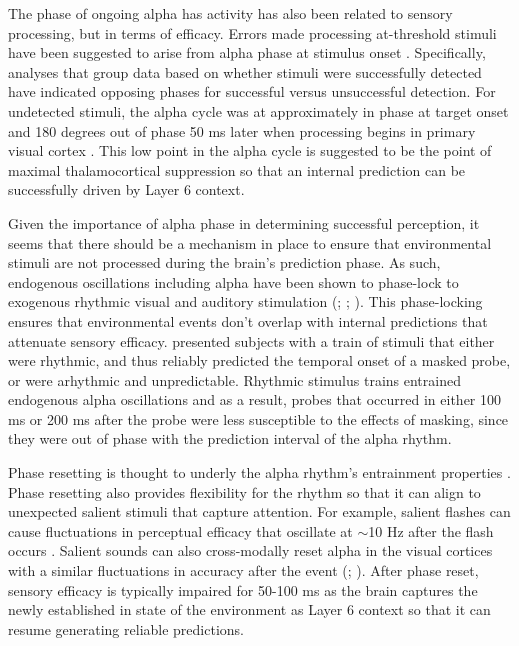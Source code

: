 \documentclass[dwyatte_dissertation.tex]{subfiles}
\begin{document}
The phase of ongoing alpha has activity has also been related to sensory processing, but in terms of efficacy. Errors made processing at-threshold stimuli have been suggested to arise from alpha phase at stimulus onset \cite{MathewsonGrattonFabianiEtAl09,BuschDuboisVanRullen09}. Specifically, analyses that group data based on whether stimuli were successfully detected have indicated opposing phases for successful versus unsuccessful detection. For undetected stimuli, the alpha cycle was at approximately in phase at target onset and 180 degrees out of phase 50 ms later when processing begins in primary visual cortex \cite{NowakBullier97,FoxeSimpson02}. This low point in the alpha cycle is suggested to be the point of maximal thalamocortical suppression  so that an internal prediction can be successfully driven by Layer 6 context. 

Given the importance of alpha phase in determining successful perception, it seems that there should be a mechanism in place to ensure that environmental stimuli are not processed during the brain's prediction phase. As such, endogenous oscillations including alpha have been shown to phase-lock to exogenous rhythmic visual and auditory stimulation (; ; ). This phase-locking ensures that environmental events don't overlap with internal predictions that attenuate sensory efficacy.  presented subjects with a train of stimuli that either were rhythmic, and thus reliably predicted the temporal onset of a masked probe, or were arhythmic and unpredictable. Rhythmic stimulus trains entrained endogenous alpha oscillations and as a result, probes that occurred in either 100 ms or 200 ms after the probe were less susceptible to the effects of masking, since they were out of phase with the prediction interval of the alpha rhythm.

Phase resetting is thought to underly the alpha rhythm's entrainment properties \cite{CalderoneLakatosButlerEtAlInPress}. Phase resetting also provides flexibility for the rhythm  so that it can align to unexpected salient stimuli that capture attention. For example, salient flashes can cause fluctuations in perceptual efficacy that oscillate at $\sim$10 Hz after the flash occurs \cite{LandauFries12}. Salient sounds can also cross-modally reset alpha in the visual cortices with a similar fluctuations in accuracy after the event (; ). After phase reset, sensory efficacy is typically impaired for 50-100 ms as the brain captures the newly established in state of the environment as Layer 6 context so that it can resume generating reliable predictions.
\end{document}
